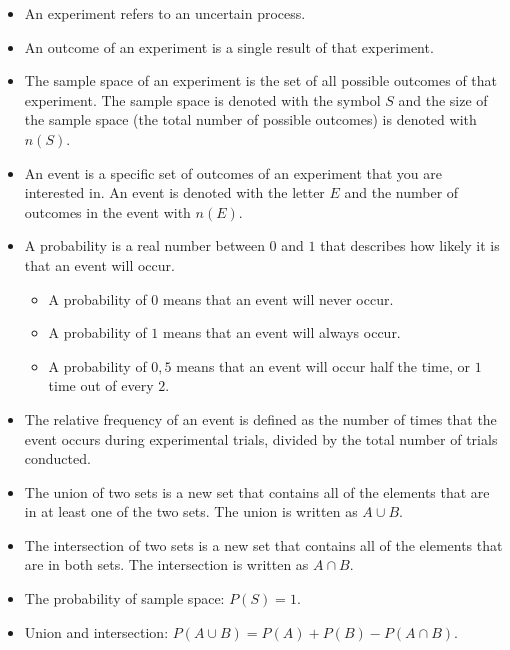 \begin{itemize}
\item An experiment refers to an uncertain process.

\item An outcome of an experiment is a single
  result of that experiment.

\item The sample space of an experiment is
  the set of all possible outcomes of that experiment. The sample
  space is denoted with the symbol $S$ and the size of the sample
  space (the total number of possible outcomes) is denoted with
  $n(S)$.

\item An event is a specific set of outcomes of an
  experiment that you are interested in. An event is denoted with the
  letter $E$ and the number of outcomes in the event with $n(E)$.

\item A probability is a real number between
  $0$ and $1$ that describes how likely it is that an event will occur.
\begin{itemize}
\item A probability of $0$ means that an event will never occur.
\item A probability of $1$ means that an event will always occur.
\item A probability of $0,5$ means that an event will occur half the
  time, or $1$ time out of every $2$.
\end{itemize}

\item The relative frequency of an event is
  defined as the number of times that the event occurs during
  experimental trials, divided by the total number of trials
  conducted.

\item The union of two sets is a new set that contains
  all of the elements that are in at least one of the two sets. The
  union is written as $A \cup B$.

\item The intersection of two sets is a new set
  that contains all of the elements that are in both sets. The
  intersection is written as $A \cap B$.

\item The probability of sample space:  $P(S)=1$.

\item Union and intersection: $P(A \cup B) = P(A) + P(B) - P(A \cap B)$.



\end{itemize}
